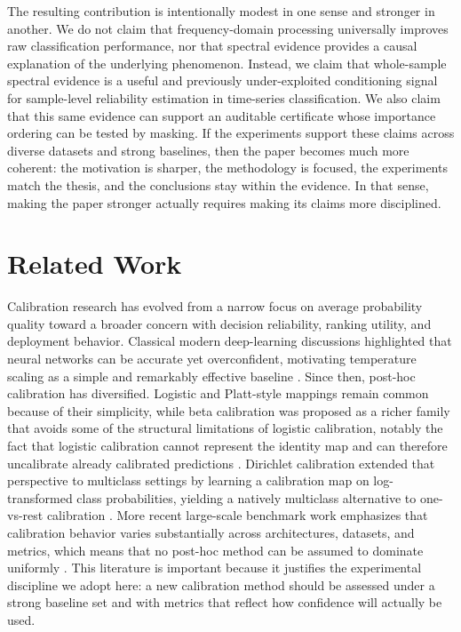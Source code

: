 \documentclass{article}
\begin{document}
The resulting contribution is intentionally modest in one sense and stronger in another. We do not claim that frequency-domain processing universally improves raw classification performance, nor that spectral evidence provides a causal explanation of the underlying phenomenon. Instead, we claim that whole-sample spectral evidence is a useful and previously under-exploited conditioning signal for sample-level reliability estimation in time-series classification. We also claim that this same evidence can support an auditable certificate whose importance ordering can be tested by masking. If the experiments support these claims across diverse datasets and strong baselines, then the paper becomes much more coherent: the motivation is sharper, the methodology is focused, the experiments match the thesis, and the conclusions stay within the evidence. In that sense, making the paper stronger actually requires making its claims more disciplined.

\section{Related Work}
Calibration research has evolved from a narrow focus on average probability quality toward a broader concern with decision reliability, ranking utility, and deployment behavior. Classical modern deep-learning discussions highlighted that neural networks can be accurate yet overconfident, motivating temperature scaling as a simple and remarkably effective baseline \cite{guo2017calibration}. Since then, post-hoc calibration has diversified. Logistic and Platt-style mappings remain common because of their simplicity, while beta calibration was proposed as a richer family that avoids some of the structural limitations of logistic calibration, notably the fact that logistic calibration cannot represent the identity map and can therefore uncalibrate already calibrated predictions \cite{kull2017beta}. Dirichlet calibration extended that perspective to multiclass settings by learning a calibration map on log-transformed class probabilities, yielding a natively multiclass alternative to one-vs-rest calibration \cite{kull2019dirichlet}. More recent large-scale benchmark work emphasizes that calibration behavior varies substantially across architectures, datasets, and metrics, which means that no post-hoc method can be assumed to dominate uniformly \cite{tao2023benchmark,manokhin2026scale}. This literature is important because it justifies the experimental discipline we adopt here: a new calibration method should be assessed under a strong baseline set and with metrics that reflect how confidence will actually be used.
\end{document}
